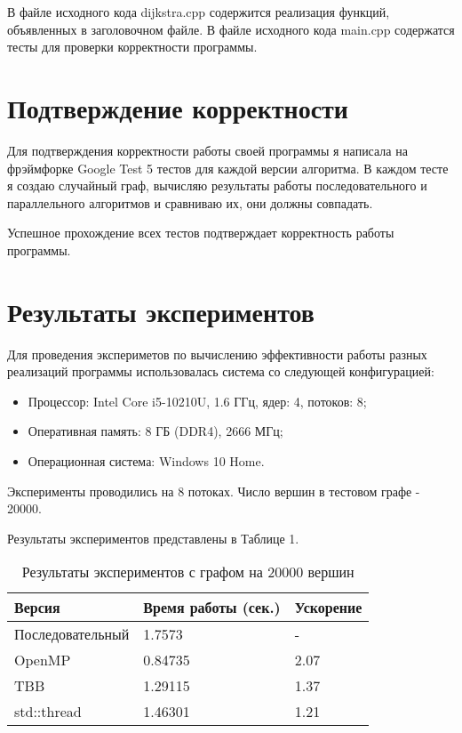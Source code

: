 \documentclass{report}
\begin{document}
\par В файле исходного кода dijkstra.cpp содержится реализация функций, объявленных в заголовочном файле. В файле исходного кода main.cpp содержатся тесты для проверки корректности программы.
\newpage

\section*{Подтверждение корректности}
Для подтверждения корректности работы своей программы я написала на фрэймфорке Google Test 5 тестов для каждой версии алгоритма. В каждом тесте я создаю случайный граф, вычисляю результаты работы последовательного и параллельного алгоритмов и сравниваю их, они должны совпадать.
\par Успешное прохождение всех тестов подтверждает корректность работы программы.
\newpage

\section*{Результаты экспериментов}
Для проведения экспериметов по вычислению эффективности работы разных реализаций программы использовалась система со следующей конфигурацией:
\begin{itemize}
\item Процессор: Intel Core i5-10210U, 1.6 ГГц, ядер: 4, потоков: 8;
\item Оперативная память: 8 ГБ (DDR4), 2666 МГц;
\item Операционная система: Windows 10 Home.
\end{itemize}

\par Эксперименты проводились на 8 потоках. Число вершин в тестовом графе - 20000.

\par Результаты экспериментов представлены в Таблице 1.
\begin{table}[!h]
\centering
\begin{tabular}{| p{4cm} | p{4cm} | p{2cm} |}
\hline
Версия & Время работы (сек.) & Ускорение  \\[5pt]
\hline
Последовательный        & 1.7573        & -         \\
OpenMP        & 0.84735        & 2.07          \\
TBB       & 1.29115        & 1.37         \\
std::thread        & 1.46301        & 1.21           \\
\hline
\end{tabular}
\caption{Результаты экспериментов с графом на 20000 вершин}
\end{table}
\end{document}
